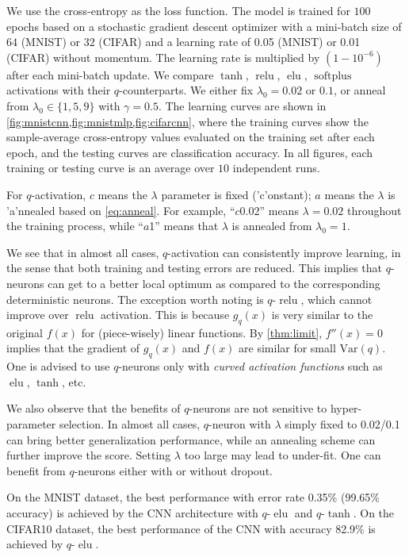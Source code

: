 \documentclass{article}
\def\Var{\mathrm{Var}}
\DeclareMathOperator{\relu}{\mathrm{relu}}
\DeclareMathOperator{\elu}{\mathrm{elu}}
\DeclareMathOperator{\softplus}{\mathrm{softplus}}
\begin{document}
We use the cross-entropy as the loss function.
The model is trained for $100$ epochs
based on a stochastic gradient descent optimizer
with a mini-batch size of $64$ (MNIST) or $32$ (CIFAR) and
a learning rate of 0.05 (MNIST) or 0.01 (CIFAR) without momentum.
The learning rate is multiplied by $(1-10^{-6})$ after each mini-batch update.
We compare $\tanh$, $\relu$, $\elu$, $\softplus$ activations with their $q$-counterparts.
We either fix $\lambda_0=0.02$ or $0.1$, or anneal from $\lambda_0\in\{1,5,9\}$ with $\gamma=0.5$.
The learning curves are shown in \cref{fig:mnistcnn,fig:mnistmlp,fig:cifarcnn},
where the training curves show the sample-average cross-entropy values evaluated
on the training set after each epoch,
and the testing curves are classification accuracy.
In all figures, each training or testing curve is an average over $10$ independent runs.

For $q$-activation, $c$ means the $\lambda$ parameter is fixed ('c'onstant); $a$ means the 
$\lambda$ is 'a'nnealed based on \cref{eq:anneal}. For example, ``$c$0.02'' means $\lambda=0.02$ throughout the training process,
while ``$a$1'' means that $\lambda$ is annealed from $\lambda_0=1$.

We see that in almost all cases, $q$-activation can consistently improve
learning, in the sense that both training and testing errors are reduced.
This implies that $q$-neurons can get to a better local optimum as compared to
the corresponding deterministic neurons.
The exception worth noting is $q$-$\relu$, which cannot improve over $\relu$ activation.
This is because $g_q(x)$ is very similar to the original $f(x)$ for (piece-wisely) linear functions.
By \cref{thm:limit}, $f''(x)=0$ implies that the gradient of 
$g_q(x)$ and $f(x)$ are similar for small $\Var(q)$.
One is advised to use $q$-neurons only with {\em curved activation
functions} such as $\elu$, $\tanh$, etc.

We also observe that the benefits of $q$-neurons are not sensitive to
hyper-parameter selection.  In almost all cases, $q$-neuron with
$\lambda$ simply fixed to 0.02/0.1 can bring better generalization
performance, while an annealing scheme can further improve the score.
Setting $\lambda$ too large may lead to under-fit.
One can benefit from $q$-neurons either with or without dropout.

On the MNIST dataset, the best performance with error rate 0.35\% (99.65\% accuracy)
is achieved by the CNN architecture with $q$-$\elu$ and $q$-$\tanh$.
On the CIFAR10 dataset, the best performance of the CNN with accuracy 82.9\%
is achieved by $q$-$\elu$.
\end{document}
